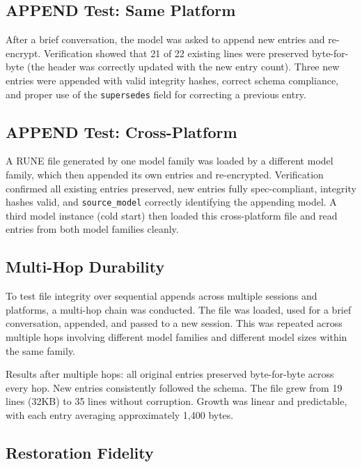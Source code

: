 \documentclass[11pt,a4paper]{article}
\begin{document}
\subsection{APPEND Test: Same Platform}

After a brief conversation, the model was asked to append new entries and re-encrypt. Verification showed that 21 of 22 existing lines were preserved byte-for-byte (the header was correctly updated with the new entry count). Three new entries were appended with valid integrity hashes, correct schema compliance, and proper use of the \texttt{supersedes} field for correcting a previous entry.

\subsection{APPEND Test: Cross-Platform}

A RUNE file generated by one model family was loaded by a different model family, which then appended its own entries and re-encrypted. Verification confirmed all existing entries preserved, new entries fully spec-compliant, integrity hashes valid, and \texttt{source\_model} correctly identifying the appending model. A third model instance (cold start) then loaded this cross-platform file and read entries from both model families cleanly.

\subsection{Multi-Hop Durability}

To test file integrity over sequential appends across multiple sessions and platforms, a multi-hop chain was conducted. The file was loaded, used for a brief conversation, appended, and passed to a new session. This was repeated across multiple hops involving different model families and different model sizes within the same family.

Results after multiple hops: all original entries preserved byte-for-byte across every hop. New entries consistently followed the schema. The file grew from 19 lines (32KB) to 35 lines without corruption. Growth was linear and predictable, with each entry averaging approximately 1,400 bytes.

\subsection{Restoration Fidelity}
\end{document}
